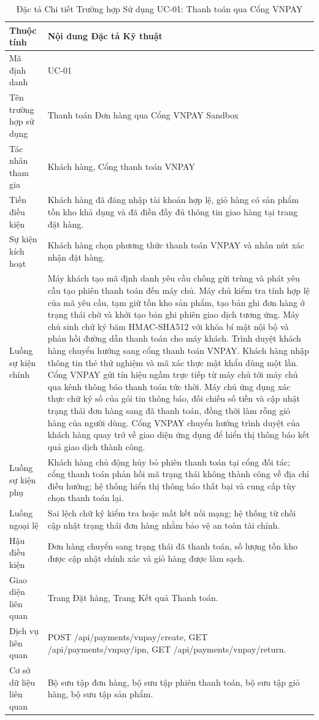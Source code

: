 \begin{table}[H]
\centering
\caption{Đặc tả Chi tiết Trường hợp Sử dụng UC-01: Thanh toán qua Cổng VNPAY}
\label{tab:uc01}
\begin{tabularx}{\textwidth}{p{3.5cm}X}
\toprule
\textbf{Thuộc tính} & \textbf{Nội dung Đặc tả Kỹ thuật} \\
\midrule
Mã định danh & UC-01 \\
Tên trường hợp sử dụng & Thanh toán Đơn hàng qua Cổng VNPAY Sandbox \\
Tác nhân tham gia & Khách hàng, Cổng thanh toán VNPAY \\
Tiền điều kiện & Khách hàng đã đăng nhập tài khoản hợp lệ, giỏ hàng có sản phẩm tồn kho khả dụng và đã điền đầy đủ thông tin giao hàng tại trang đặt hàng. \\
Sự kiện kích hoạt & Khách hàng chọn phương thức thanh toán VNPAY và nhấn nút xác nhận đặt hàng. \\
Luồng sự kiện chính & 
Máy khách tạo mã định danh yêu cầu chống gửi trùng và phát yêu cầu tạo phiên thanh toán đến máy chủ.
Máy chủ kiểm tra tính hợp lệ của mã yêu cầu, tạm giữ tồn kho sản phẩm, tạo bản ghi đơn hàng ở trạng thái chờ và khởi tạo bản ghi phiên giao dịch tương ứng.
Máy chủ sinh chữ ký băm HMAC-SHA512 với khóa bí mật nội bộ và phản hồi đường dẫn thanh toán cho máy khách.
Trình duyệt khách hàng chuyển hướng sang cổng thanh toán VNPAY. Khách hàng nhập thông tin thẻ thử nghiệm và mã xác thực mật khẩu dùng một lần.
Cổng VNPAY gửi tín hiệu ngầm trực tiếp từ máy chủ tới máy chủ qua kênh thông báo thanh toán tức thời.
Máy chủ ứng dụng xác thực chữ ký số của gói tin thông báo, đối chiếu số tiền và cập nhật trạng thái đơn hàng sang đã thanh toán, đồng thời làm rỗng giỏ hàng của người dùng.
Cổng VNPAY chuyển hướng trình duyệt của khách hàng quay trở về giao diện ứng dụng để hiển thị thông báo kết quả giao dịch thành công. \\
Luồng sự kiện phụ & Khách hàng chủ động hủy bỏ phiên thanh toán tại cổng đối tác; cổng thanh toán phản hồi mã trạng thái không thành công về địa chỉ điều hướng; hệ thống hiển thị thông báo thất bại và cung cấp tùy chọn thanh toán lại. \\
Luồng ngoại lệ & Sai lệch chữ ký kiểm tra hoặc mất kết nối mạng; hệ thống từ chối cập nhật trạng thái đơn hàng nhằm bảo vệ an toàn tài chính. \\
Hậu điều kiện & Đơn hàng chuyển sang trạng thái đã thanh toán, số lượng tồn kho được cập nhật chính xác và giỏ hàng được làm sạch. \\
Giao diện liên quan & Trang Đặt hàng, Trang Kết quả Thanh toán. \\
Dịch vụ liên quan & POST /api/payments/vnpay/create, GET /api/payments/vnpay/ipn, GET /api/payments/vnpay/return. \\
Cơ sở dữ liệu liên quan & Bộ sưu tập đơn hàng, bộ sưu tập phiên thanh toán, bộ sưu tập giỏ hàng, bộ sưu tập sản phẩm. \\
\bottomrule
\end{tabularx}
\end{table}

